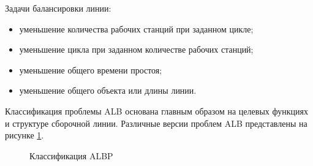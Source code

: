 Задачи балансировки линии:

\begin{itemize}
    \item уменьшение количества рабочих станций при заданном цикле;
    \item уменьшение цикла при заданном количестве рабочих станций;
    \item уменьшение общего времени простоя;
    \item уменьшение общего объекта или длины линии.
\end{itemize}

Классификация проблемы ALB основана главным образом на целевых функциях и структуре сборочной линии. Различные версии проблем ALB представлены на рисунке \ref{ris:image1}.

\begin{figure}[H]
    \caption{Классификация ALBP}
    \label{ris:image1}
\end{figure}

